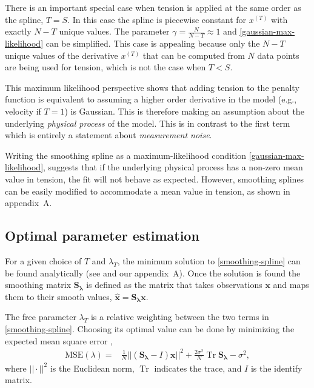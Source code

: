 \documentclass{ametsoc}
\DeclareMathOperator{\Tr}{Tr}
\begin{document}
There is an important special case when tension is applied at the same order as the spline, $T=S$. In this case the spline is piecewise constant for $x^{(T)}$ with exactly $N-T$ unique values. The parameter $\gamma =\frac{N}{N-T}\approx 1$ and \eqref{gaussian-max-likelihood} can be simplified. This case is appealing because only the $N-T$ unique values of the derivative $x^{(T)}$ that can be computed from $N$ data points are being used for tension, which is not the case when $T<S$.

This maximum likelihood perspective shows that adding tension to the penalty function is equivalent to assuming a higher order derivative in the model (e.g., velocity if $T=1$) is Gaussian. This is therefore making an assumption about the underlying \emph{physical process} of the model. This is in contrast to the first term which is entirely a statement about \emph{measurement noise}.

Writing the smoothing spline as a maximum-likelihood condition \eqref{gaussian-max-likelihood}, suggests that if the underlying physical process has a non-zero mean value in tension, the fit will not behave as expected. However, smoothing splines can be easily modified to accommodate a mean value in tension, as shown in appendix~A. 

\subsection{Optimal parameter estimation}
\label{subsec:optimal_parameter}

For a given choice of $T$ and $\lambda_T$, the minimum solution to \eqref{smoothing-spline} can be found analytically (see \citet{teanby2007-mg} and our appendix~A). Once the solution is found the smoothing matrix $\mathbf{S_\lambda}$ is defined as the matrix that takes observations $\mathbf{x}$ and maps them to their smooth values, $\mathbf{\hat{x}} = \mathbf{S_\lambda} \mathbf{x}$.

The free parameter $\lambda_T$ is a relative weighting between the two terms in \eqref{smoothing-spline}. Choosing its optimal value can be done by minimizing the expected mean square error \citep{craven1979-nm},
\begin{align}
\label{MSE}
    \textrm{MSE}(\lambda) =& \frac{1}{N} || \left( \mathbf{S_\lambda} - I \right) \mathbf{x} ||^2 + \frac{2 \sigma^2}{N}  \Tr \mathbf{S_\lambda} - \sigma^2,
\end{align}
where $||\cdot||^2$ is the Euclidean norm, $\Tr$ indicates the trace, and $I$ is the identify matrix.
\end{document}
